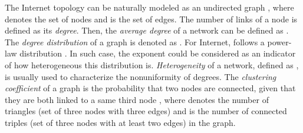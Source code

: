 \documentclass[a4paper]{llncs}
\begin{document}
The Internet topology can be naturally modeled as an undirected graph ,
where  denotes the set of nodes and  is the set of edges. The number of links of a node is defined as its {\it degree}. Then, the {\it average degree} of a network can be defined as .
The {\it degree distribution} of a graph is denoted as . For Internet,  follows a power-law distribution  \cite{PowerLawRelationship}.
In such case, the exponent  could be considered as
an indicator of how heterogeneous this distribution is.
{\it Heterogeneity} of a
network, defined as ,
is usually used to characterize the nonuniformity of degrees. The {\it clustering coefficient} of a graph is the probability that two nodes are connected, given that they are both linked to a same third node ,
where  denotes the number of triangles (set of three nodes with three edges) and  is the number of connected triples (set of three nodes with at least two edges) in the graph.
\begin{comment}
\begin{table*}[!t]
\scriptsize
\caption{Network topology properties of the two real datasets: iPlane and skitter.}
\label{Properties of iPlane and skitter}
\vspace{-1.2em}
\centering
\setlength{\tabcolsep}{5pt}
\begin{tabular}{c||c|c|c|c|c|c|c}
\hline \hline
    Dataset &  &  &  &  &  &  &  \\
\hline
    iPlane & 266,317 & 1,663,170 & 12.49 & 2.799 & 0.000047 & 0.0294 & 8.411 \\
\hline
    skitter & 771,312 & 1,785,922 & 4.63 & 2.39 & 0.000006 & 0.000782  & 130.72 \\
\hline \hline
\end{tabular}
\end{table*}
\end{comment}
\begin{comment}
\begin{figure}[!t]
\centering
\texttt{[image: figure/figure1.eps]}
\vspace{-1.5em}
\caption{ of  of the two real Internet datasets: iPlane and skitter, respectively.}
\label{figure1}
\vspace{-0.5em}
\end{figure}
\end{comment}
\begin{comment}
Table \ref{Properties of iPlane and skitter} lists detailed properties of  of the two datasets and we can easily find that the two datasets are different from each other, especially on the average degree.
\end{comment}
\end{document}
